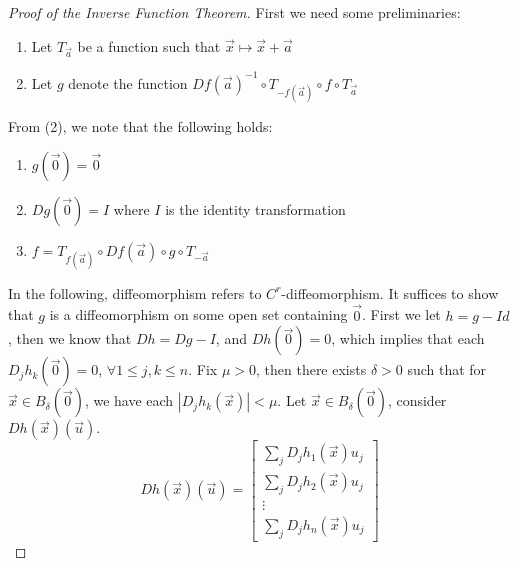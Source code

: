 \documentclass[11pt,oneside]{book}
\theoremstyle{break}
\theoremstyle{break}
\begin{document}
\begin{proof}[Proof of the Inverse Function Theorem]
\hfill\break First we need some preliminaries:\begin{enumerate}[topsep=3pt,itemsep=-1ex,partopsep=1ex,parsep=1ex]
\item Let $T_{\vec{a}}$ be a function such that $\vec{x} \mapsto \vec{x}+\vec{a}$
\item Let $g$ denote the function $Df(\vec{a})^{-1}\circ T_{-f(\vec{a})} \circ f\circ T_{\vec{a}}$
\end{enumerate}

From (2), we note that the following holds:
\begin{enumerate}[topsep=3pt,itemsep=-1ex,partopsep=1ex,parsep=1ex]
\item $g(\vec{0}) = \vec{0}$
\item $Dg(\vec{0}) = I$ where $I$ is the identity transformation
\item $f = T_{f(\vec{a})}\circ Df(\vec{a})\circ g\circ T_{-\vec{a}}$
\end{enumerate}

In the following, diffeomorphism refers to $C^r$-diffeomorphism. It suffices to show that $g$ is a diffeomorphism on some open set containing $\vec{0}$. First we let $h = g-Id$, then we know that $Dh = Dg-I$, and $Dh(\vec{0}) = 0$, which implies that each $D_j h_k(\vec{0}) = 0$, $\forall 1\leq j,k \leq n$. Fix $\mu >0$, then there exists $\delta >0$ such that for $\vec{x}\in B_\delta(\vec{0})$, we have each $|D_jh_k(\vec{x})| < \mu$. Let $\vec{x} \in B_\delta(\vec{0})$, consider $Dh(\vec{x})(\vec{u})$. 
$$Dh(\vec{x})(\vec{u}) = \begin{bmatrix}
\sum_j D_jh_1(\vec{x})u_j\\\sum_j D_jh_2(\vec{x})u_j \\ \vdots \\ \sum_j D_j h_n (\vec{x})u_j
\end{bmatrix}$$


\end{proof}
\end{document}
